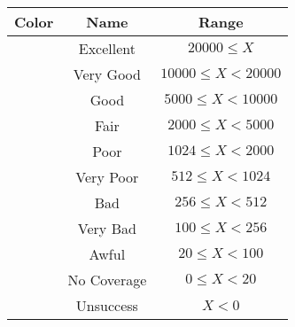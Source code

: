 \begin{tabular}{|c|c|c|}\hline
\rowcolor{Plum!20}
Color&Name&Range\\\hline\hline
\cellcolor[HTML]{00703c} &Excellent&$20000\leq X$\\\hline
\cellcolor[HTML]{00a032} &Very Good&$10000\leq X<20000$\\\hline
\cellcolor[HTML]{00d228} &Good&$5000\leq X<10000$\\\hline
\cellcolor[HTML]{ffff00} &Fair&$2000\leq X<5000$\\\hline
\cellcolor[HTML]{ffaa00} &Poor&$1024\leq X<2000$\\\hline
\cellcolor[HTML]{fa6400} &Very Poor&$512\leq X<1024$\\\hline
\cellcolor[HTML]{ff0000} &Bad&$256\leq X<512$\\\hline
\cellcolor[HTML]{dc143c} &Very Bad&$100\leq X<256$\\\hline
\cellcolor[HTML]{820000} &Awful&$20\leq X<100$\\\hline
\cellcolor[HTML]{aaaaaa} &No Coverage&$0\leq X<20$\\\hline
\cellcolor[HTML]{1e90ff} &Unsuccess&$X<0$\\\hline
\end{tabular}
